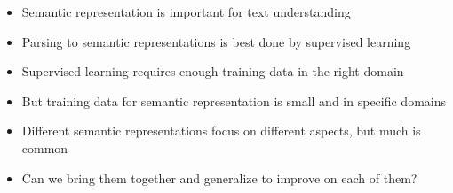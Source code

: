 \documentclass[t,xcolor={svgnames}]{beamer}
\begin{document}
\begin{frame}
\begin{itemize}
\item Semantic representation is important for text understanding
\item Parsing to semantic representations is best done by supervised learning
\item Supervised learning requires enough training data in the right domain
\item But training data for semantic representation is small and in specific domains
\item Different semantic representations focus on different aspects, but much is common
\item Can we bring them together and generalize to improve on each of them?
\end{itemize}
\end{frame}
\end{document}
